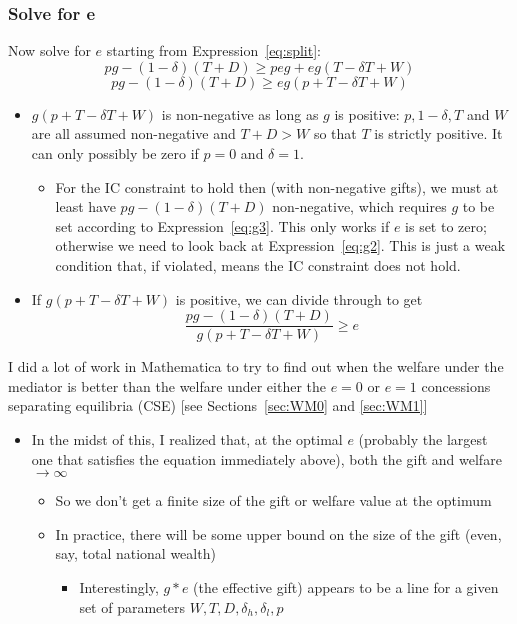 \documentclass[12pt]{article}
\newcommand{\de}{\delta}
\begin{document}
\subsubsection{Solve for e}
				Now solve for $e$ starting from Expression~\ref{eq:split}:
					$$pg - \left(1 - \de \right) \left( T + D \right) \geq peg + eg \left( T - \de T + W \right)$$
					\begin{equation}
						pg - \left(1 - \de \right) \left( T + D \right) \geq eg \left( p + T - \de T + W \right)
						\label{eq:g5}
					\end{equation}
						\begin{itemize}
							\item {\color{red} $g \left( p + T - \de T + W \right)$ is non-negative as long as $g$ is positive}: $p, 1-\de, T$ and $W$ are all assumed non-negative and $T+D > W$ so that $T$ is strictly positive. It can only possibly be zero if $p=0$ and $\de = 1$.
								\begin{itemize}
									\item For the IC constraint to hold then (with non-negative gifts), we must at least have {\color{red} $pg - \left(1 - \de \right) \left( T + D \right)$ non-negative, which requires $g$ to be set according to Expression~\ref{eq:g3}}. This only works if $e$ is set to zero; otherwise we need to look back at Expression~\ref{eq:g2}. This is just a weak condition that, if violated, means the IC constraint does not hold.
								\end{itemize}
							\item If {\color{red} $g \left( p + T - \de T + W \right)$ is positive}, we can divide through to get
								$$\frac{pg - \left(1 - \de \right) \left( T + D \right)}{g \left( p + T - \de T + W \right)} \geq e$$
						\end{itemize}
						
I did a lot of work in Mathematica to try to find out when the welfare under the mediator is better than the welfare under either the $e=0$ or $e=1$ concessions separating equilibria (CSE) [see Sections~\ref{sec:WM0} and \ref{sec:WM1}]
\begin{itemize}
	\item In the midst of this, I realized that, at the optimal $e$ (probably the largest one that satisfies the equation immediately above), both the gift and welfare $\rightarrow \infty$
		\begin{itemize}
			\item So we don't get a finite size of the gift or welfare value at the optimum
			\item In practice, there will be some upper bound on the size of the gift (even, say, total national wealth)
				\begin{itemize}
					\item Interestingly, $g*e$ (the effective gift) appears to be a line for a given set of parameters $W,T,D,\de_h,\de_l,p$
				\end{itemize}
		\end{itemize}
\end{itemize}
\end{document}
